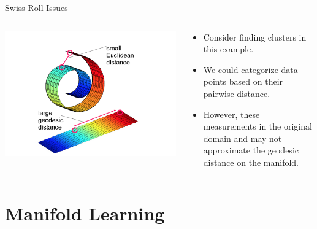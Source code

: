 \documentclass[xcolor={dvipsnames,table}]{beamer}
\begin{document}
\begin{frame}{Swiss Roll Issues}
	\begin{columns}
		\begin{column}{0.5\textwidth}
   			\includegraphics[width=\textwidth]{motive.png}
		\end{column}
		\begin{column}{0.5\textwidth}  %
    		\begin{itemize}
     		\item Consider finding clusters in this example.
     		\item We could categorize data points based on their pairwise distance. 
     		\item However, these measurements in the original domain and may not approximate the geodesic distance on the manifold.
     		\end{itemize}
		\end{column}
	\end{columns}
\end{frame}




\section{Manifold Learning}
\end{document}
